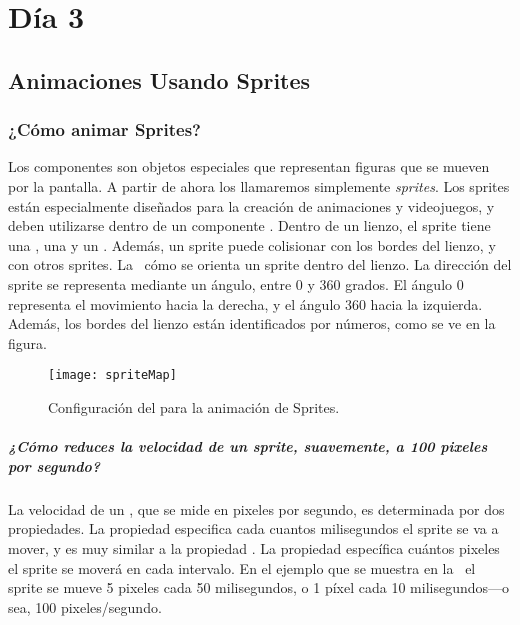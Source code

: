 \chapter{Día 3}

\section{Animaciones Usando Sprites}

\subsection*{¿Cómo animar Sprites?}

Los componentes  son objetos especiales que
representan figuras que se mueven por la pantalla. A partir de ahora
los llamaremos simplemente \emph{sprites}. Los sprites están
especialmente diseñados para la creación de animaciones y videojuegos,
y deben utilizarse dentro de un componente . Dentro
de un lienzo, el sprite tiene una , una
 y un . Además, un sprite puede
colisionar con los bordes del lienzo, y con otros
sprites. La~ cómo se orienta un sprite dentro del
lienzo. La dirección del sprite se representa mediante un ángulo,
entre 0 y 360 grados. El ángulo 0 representa el movimiento hacia la
derecha, y el ángulo 360 hacia la izquierda. Además, los bordes del
lienzo están identificados por números, como se ve en la figura.

\begin{figure}[H]
\centering
\texttt{[image: spriteMap]}
\caption{Configuración del  para la animación de Sprites.}
\label{fig:spriteMap}
\end{figure}

\paragraph{¿Cómo reduces la velocidad de un sprite, suavemente, a 100
  pixeles por segundo?}

La velocidad de un , que se mide en pixeles
por segundo, es determinada por dos propiedades. La propiedad
 especifica cada cuantos milisegundos el sprite se
va a mover, y es muy similar a la propiedad
. La propiedad
 específica cuántos pixeles el sprite se moverá en
cada intervalo. En el ejemplo que se muestra en la~
el sprite se mueve 5 pixeles cada 50 milisegundos, o 1 píxel cada 10
milisegundos---o sea, 100 pixeles/segundo.

